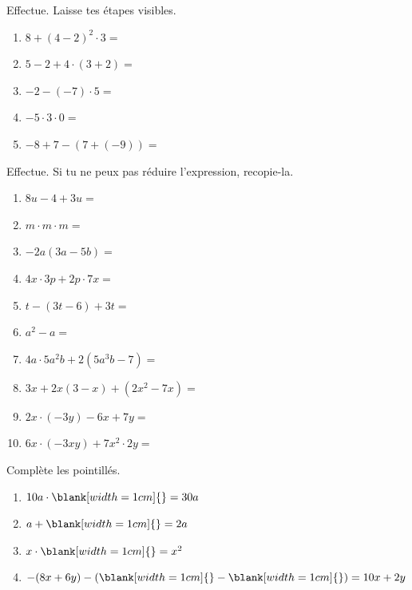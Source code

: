 \documentclass[parskip=half-,DIV=12,twoside=semi, 12pt]{scrartcl}
\newcounter{l}
\begin{document}
\begin{appliquer}[points=5]
    Effectue. Laisse tes étapes visibles.
    \begin{enumerate}[cols=2, itemsep=2cm]
        \item \(8+(4-2)^2\cdot 3=\)
        \item \(5-2+4\cdot (3+2)=\)
        \item \(-2-(-7)\cdot 5=\)
        \item \(-5\cdot 3\cdot 0=\)
        \item \(-8 + 7 -(7+(-9))=\)
    \end{enumerate}
    \vspace*{2cm}
\end{appliquer}
\begin{appliquer}[points=10]
    Effectue. Si tu ne peux pas réduire l'expression, recopie-la.
    \begin{enumerate}[itemsep=2.2cm]
        \item \(8u-4+3u=\)
        \item \(m\cdot m \cdot m =\)
        \item \(-2a(3a-5b)=\)
        \item \(4x\cdot 3p + 2p \cdot 7x=\)
        \item \(t-(3t-6) + 3t=\)
        \item \(a^2 - a=\)
        \item \(4a\cdot 5a^2b + 2(5a^3b -7)=\)
        \item \(3x + 2x(3-x) + (2x^2-7x)=\)
        \item \(2x \cdot (-3y) - 6x + 7y=\)
        \item \(6x \cdot (-3xy) + 7x^2 \cdot 2y=\)
    \end{enumerate}
    \vspace*{2cm}
\end{appliquer}
\newpage
\begin{appliquer}[points=4]
    Complète les pointillés.
    \begin{enumerate}[cols=2]
        \item \(10a\cdot \blank[width=1cm]{} = 30a\)
        \item \(a + \blank[width=1cm]{} = 2a\)
        \item \(x \cdot \blank[width=1cm]{} = x^2\)
        \item \(-(8x+6y)- (\blank[width=1cm]{} - \blank[width=1cm]{} ) = 10x + 2y\)
    \end{enumerate}
\end{appliquer}
\end{document}
